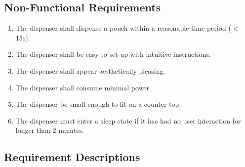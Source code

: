 \documentclass[12pt]{article}
\begin{document}
\subsection{Non-Functional Requirements}
\begin{enumerate}
    \item The dispenser shall dispense a pouch within a reasonable time period ($<$ 15s).
    \item The dispenser shall be easy to set-up with intuitive instructions.
    \item The dispenser shall appear aesthetically pleasing.
    \item The dispenser shall consume minimal power.
    \item The dispenser be small enough to fit on a counter-top.
     \item The dispenser must enter a sleep state if it has had no user interaction for longer than 2 minutes.
\end{enumerate}

\subsection{Requirement Descriptions}
\setlength{\parindent}{0pt} %

\end{document}
